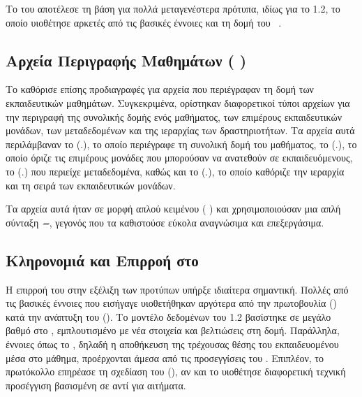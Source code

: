 

Το   του  αποτέλεσε τη βάση για πολλά μεταγενέστερα πρότυπα, ιδίως για το  1.2, το οποίο υιοθέτησε αρκετές από τις βασικές έννοιες και τη δομή του ~\cite{elearningchef2024comparison}.

\subsection{Αρχεία Περιγραφής Μαθημάτων (  )}

Το  καθόρισε επίσης προδιαγραφές για αρχεία που περιέγραφαν τη δομή των εκπαιδευτικών μαθημάτων. Συγκεκριμένα, ορίστηκαν διαφορετικοί τύποι αρχείων για την περιγραφή της συνολικής δομής ενός μαθήματος, των επιμέρους εκπαιδευτικών μονάδων, των μεταδεδομένων και της ιεραρχίας των δραστηριοτήτων. Τα αρχεία αυτά περιλάμβαναν το    (.), το οποίο περιέγραφε τη συνολική δομή του μαθήματος, το    (.), το οποίο όριζε τις επιμέρους μονάδες που μπορούσαν να ανατεθούν σε εκπαιδευόμενους, το   (.) που περιείχε μεταδεδομένα, καθώς και το    (.), το οποίο καθόριζε την ιεραρχία και τη σειρά των εκπαιδευτικών μονάδων.

Τα αρχεία αυτά ήταν σε μορφή απλού κειμένου ( ) και χρησιμοποιούσαν μια απλή σύνταξη \textit{=}, γεγονός που τα καθιστούσε εύκολα αναγνώσιμα και επεξεργάσιμα.

\subsection{Κληρονομιά και Επιρροή στο }
\label{subsec:aicc_legacy}

Η επιρροή του  στην εξέλιξη των  προτύπων υπήρξε ιδιαίτερα σημαντική. Πολλές από τις βασικές έννοιες που εισήγαγε υιοθετήθηκαν αργότερα από την πρωτοβουλία \textit{  } () κατά την ανάπτυξη του \textit{    } (). Το μοντέλο δεδομένων του  1.2 βασίστηκε σε μεγάλο βαθμό στο    , εμπλουτισμένο με νέα στοιχεία και βελτιώσεις στη δομή. Παράλληλα, έννοιες όπως το , δηλαδή η αποθήκευση της τρέχουσας θέσης του εκπαιδευομένου μέσα στο μάθημα, προέρχονται άμεσα από τις προσεγγίσεις του . Επιπλέον, το πρωτόκολλο  επηρέασε τη σχεδίαση του    (), αν και το  υιοθέτησε διαφορετική τεχνική προσέγγιση βασισμένη σε   αντί για  αιτήματα.


